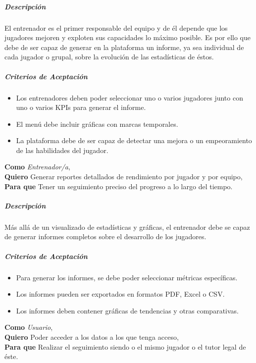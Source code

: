 \subparagraph{Descripción}
El entrenador es el primer responsable del equipo y de él depende que los jugadores mejoren y exploten sus capacidades lo máximo posible. Es por ello que debe de ser capaz de generar en la plataforma un informe, ya sea individual de cada jugador o grupal, sobre la evolución de las estadísticas de éstos.

\subparagraph{Criterios de Aceptación}
\begin{itemize}
    \item Los entrenadores deben poder seleccionar uno o varios jugadores junto con uno o varios KPIs para generar el informe.
    \item El menú debe incluir gráficas con marcas temporales.
    \item La plataforma debe de ser capaz de detectar una mejora o un empeoramiento de las habilidades del jugador.
\end{itemize}


\begin{tcolorbox}[title=Historia de Usuario: Análisis y Reportes Detallados]
\textbf{Como} \textit{Entrenador/a},\\
\textbf{Quiero} Generar reportes detallados de rendimiento por jugador y por equipo,\\
\textbf{Para que} Tener un seguimiento preciso del progreso a lo largo del tiempo.
\end{tcolorbox}

\subparagraph{Descripción}
Más allá de un visualizado de estadísticas y gráficas, el entrenador debe se capaz de generar informes completos sobre el desarrollo de los jugadores.

\subparagraph{Criterios de Aceptación}
\begin{itemize}
    \item Para generar los informes, se debe poder seleccionar métricas específicas.
    \item Los informes pueden ser exportados en formatos PDF, Excel o CSV.
    \item Los informes deben contener gráficas de tendencias y otras comparativas.
\end{itemize}

\begin{tcolorbox}[title=Historia de Usuario: Acceso a roles de usuario]
\textbf{Como} \textit{Usuario},\\
\textbf{Quiero} Poder acceder a los datos a los que tenga acceso,\\
\textbf{Para que} Realizar el seguimiento siendo o el mismo jugador o el tutor legal de éste.
\end{tcolorbox}

